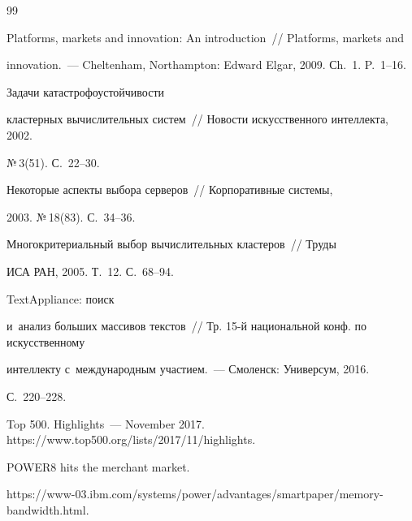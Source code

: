   {\small\frenchspacing

{%


\begin{thebibliography}{99}


 Platforms, markets and innovation: An introduction~/\!\!/ Platforms, markets and 

innovation.~--- Cheltenham, Northampton: Edward Elgar, 2009. Сh.~1. P.~1--16.




 Задачи ка\-таст\-ро\-фо\-устой\-чи\-вости 

кластерных вы\-чис\-ли\-тель\-ных сис\-тем~/\!\!/ Новости искусственного интеллекта, 2002. 

№\,3(51). С.~22--30.


 Некоторые аспекты выбора серверов~/\!\!/ Корпоративные сис\-те\-мы, 

2003. №\,18(83). С.~34--36.


 Многокритериальный выбор вы\-чис\-ли\-тель\-ных клас\-те\-ров~/\!\!/ Труды 

ИСА РАН, 2005. Т.~12. С.~68--94.


 TextAppliance: поиск 

и~анализ больших массивов текстов~/\!\!/ Тр. 15-й национальной конф. по искусственному 

интеллекту с~международным учас\-ти\-ем.~--- Смоленск: Универсум, 2016. 

С.~220--228.


Top 500. Highlights~--- November 2017. {\sf https://www.top500.org/lists/2017/11/\linebreak highlights}.


POWER8 hits the merchant market. {\sf  

https://www-03.ibm.com/systems/power/\linebreak advantages/smartpaper/memory-bandwidth.html.}




\end{thebibliography}}}
